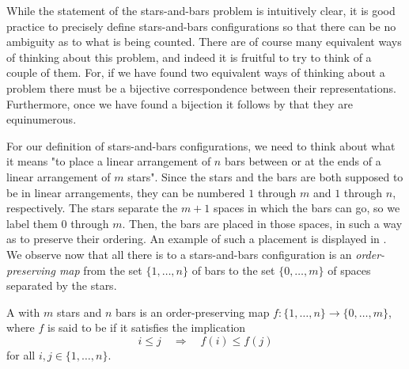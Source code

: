 While the statement of the stars-and-bars problem is intuitively clear, it is good practice to precisely define stars-and-bars configurations so that there can be no ambiguity as to what is being counted. There are of course many equivalent ways of thinking about this problem, and indeed it is fruitful to try to think of a couple of them. For, if we have found two equivalent ways of thinking about a problem there must be a bijective correspondence between their representations. Furthermore, once we have found a bijection it follows by  that they are equinumerous.

For our definition of stars-and-bars configurations, we need to think about what it means "to place a linear arrangement of $n$ bars between or at the ends of a linear arrangement of $m$ stars". Since the stars and the bars are both supposed to be in linear arrangements, they can be numbered $1$ through $m$ and $1$ through $n$, respectively. The stars separate the $m+1$ spaces in which the bars can go, so we label them $0$ through $m$. Then, the bars are placed in those spaces, in such a way as to preserve their ordering. An example of such a placement is displayed in . We observe now that all there is to a stars-and-bars configuration is an \emph{order-preserving map} from the set $\{1,\ldots,n\}$ of bars to the set $\{0,\ldots,m\}$ of spaces separated by the stars. 

\begin{definition}
  A  with $m$ stars and $n$ bars is an order-preserving map $f:\{1,\ldots,n\}\to\{0,\ldots,m\}$, where $f$ is said to be  if it satisfies the implication
  \begin{equation*}
    i\leq j\quad\Rightarrow\quad f(i)\leq f(j)
  \end{equation*}
  for all $i,j\in\{1,\ldots,n\}$.
\end{definition}

